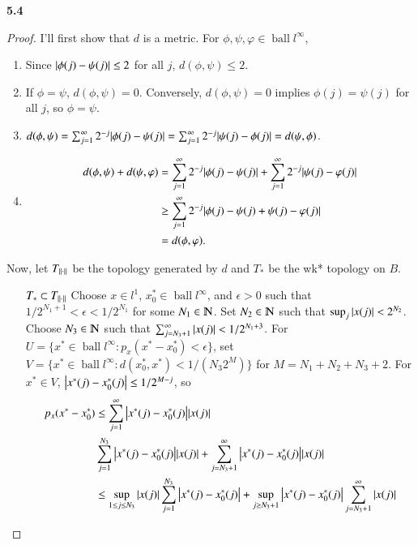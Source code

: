 \documentclass[a4paper, 12pt]{article}
\theoremstyle{Mydefinition}
\theoremstyle{Mytheorem}
\DeclareMathOperator{\ball}{ball}
\begin{document}
\noindent \textbf{5.4}
\begin{proof}
I'll first show that $d$ is a metric. For $\phi,\psi,\varphi\in \ball l^\infty$,
\begin{enumerate}
    \item Since $\abs{\phi(j)-\psi(j)}\leq 2$ for all $j$, $d(\phi,\psi)\leq 2$.
    \item If $\phi=\psi$, $d(\phi,\psi) = 0$. Conversely, $d(\phi, \psi) = 0$ implies $\phi(j) = \psi(j)$ for all $j$, so $\phi=\psi$.
    \item $d(\phi,\psi) = \sum_{j=1}^\infty 2^{-j}\abs{\phi(j)-\psi(j)} = \sum_{j=1}^\infty 2^{-j}\abs{\psi(j)-\phi(j)} = d(\psi, \phi)$.
    \item \begin{equation}
        \begin{split}
            d(\phi,\psi)+d(\psi,\varphi) &= \sum_{j=1}^\infty 2^{-j}\abs{\phi(j)-\psi(j)} +  \sum_{j=1}^\infty 2^{-j}\abs{\psi(j)-\varphi(j)} \\
            &\geq\sum_{j=1}^\infty 2^{-j}\abs{\phi(j)-\psi(j) +\psi(j)-\varphi(j)} \\
            &= d(\phi, \varphi).
        \end{split}
    \end{equation}
\end{enumerate}
Now, let $T_{\norm{\cdot}}$ be the topology generated by $d$ and $T_*$ be the wk* topology on $B$.
\begin{enumerate}
    \item[$T_*\subset T_{\norm{\cdot}}$] Choose $x\in l^1$, $x_0^*\in \ball l^\infty$, and $\epsilon>0$ such that $1/2^{N_1+1}<\epsilon<1/2^{N_1}$ for some $N_1\in\varmathbb{N}$. Set $N_2\in \varmathbb{N}$ such that $\sup_j \abs{x(j)}<2^{N_2}$. Choose $N_3\in\varmathbb{N}$ such that $\sum_{j=N_3+1}^\infty \abs{x(j)}<1/2^{N_1+3}$. For $U = \{x^*\in \ball l^\infty:p_x(x^*-x_0^*)<\epsilon\}$, set $V=\{x^*\in \ball l^\infty:d(x_0^*, x^*)<1/(N_3 2^M)\}$ for $M=N_1+N_2+N_3+2$. For $x^*\in V$, $\abs{x^*(j)-x_0^*(j)}\leq 1/2^{M-j}$, so
    \begin{equation}
    \begin{split}
        p_x(x^*-x_0^*) &\leq \sum_{j=1}^\infty \abs{x^*(j)-x_0^*(j)}\abs{x(j)}\\
        &\sum_{j=1}^{N_3} \abs{x^*(j)-x_0^*(j)}\abs{x(j)} + \sum_{j=N_3+1}^\infty \abs{x^*(j)-x_0^*(j)}\abs{x(j)} \\
        &\leq \sup_{1\leq j\leq N_3}\abs{x(j)}\sum_{j=1}^{N_3} \abs{x^*(j)-x_0^*(j)} + \sup_{j\geq N_3+1}\abs{x^*(j)-x_0^*(j)}\sum_{j=N_3+1}^\infty \abs{x(j)}\\

\end{split}
\end{equation}
\end{enumerate}
\end{proof}
\end{document}
